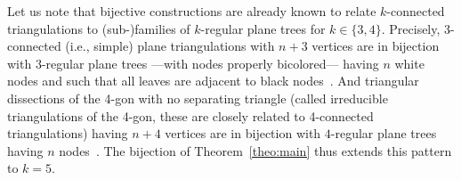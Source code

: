 \documentclass[letter]{amsart}
\numberwithin{theo}{section}
\theoremstyle{remark}
\begin{document}
Let us note that bijective constructions are already known to relate $k$-connected triangulations to (sub-)families of $k$-regular plane trees for $k\in\{3,4\}$. Precisely, 3-connected (i.e., simple) plane triangulations with $n+3$ vertices are in bijection with $3$-regular plane trees ---with nodes properly bicolored--- having $n$ white nodes and such that all leaves are adjacent to black nodes~\cite{FuPoScL,Bernardi-Fusy:dangulations}. And triangular dissections of the 4-gon with no separating triangle (called irreducible triangulations of the 4-gon, these are closely related to 4-connected triangulations) having $n+4$ vertices are in bijection with $4$-regular plane trees having $n$ nodes~\cite{Fu07b}. 
The bijection of Theorem~\ref{theo:main} thus extends this pattern to $k=5$.    

\medskip
\end{document}

